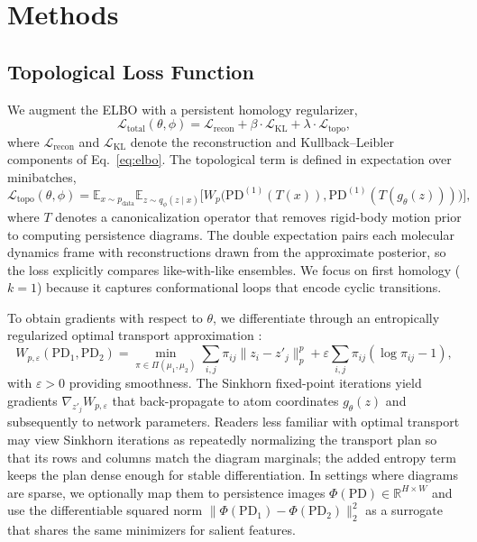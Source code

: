\documentclass[11pt]{article}
\theoremstyle{definition}
\begin{document}
\section{Methods}
\subsection{Topological Loss Function}
We augment the ELBO with a persistent homology regularizer,
\begin{equation}
    \mathcal{L}_{\text{total}}(\theta, \phi) = \mathcal{L}_{\text{recon}} + \beta \cdot \mathcal{L}_{\text{KL}} + \lambda \cdot \mathcal{L}_{\text{topo}},
    \label{eq:total_loss}
\end{equation}
where $\mathcal{L}_{\text{recon}}$ and $\mathcal{L}_{\text{KL}}$ denote the reconstruction and Kullback--Leibler components of Eq.~\eqref{eq:elbo}. The topological term is defined in expectation over minibatches,
\begin{equation}
    \mathcal{L}_{\text{topo}}(\theta, \phi) = \mathbb{E}_{x \sim p_{\text{data}}} \mathbb{E}_{z \sim q_\phi(z \mid x)} \big[ W_p\big( \mathrm{PD}^{(1)}(T(x)), \mathrm{PD}^{(1)}(T(g_\theta(z))) \big) \big],
    \label{eq:topo-loss}
\end{equation}
where $T$ denotes a canonicalization operator that removes rigid-body motion prior to computing persistence diagrams. The double expectation pairs each molecular dynamics frame with reconstructions drawn from the approximate posterior, so the loss explicitly compares like-with-like ensembles. We focus on first homology ($k=1$) because it captures conformational loops that encode cyclic transitions.

To obtain gradients with respect to $\theta$, we differentiate through an entropically regularized optimal transport approximation \cite{cuturi2013sinkhorn}:
\begin{equation}
    W_{p, \varepsilon}(\mathrm{PD}_1, \mathrm{PD}_2) = \min_{\pi \in \Pi(\mu_1, \mu_2)} \sum_{i,j} \pi_{ij} \| z_i - z'_j \|_p^p + \varepsilon \sum_{i,j} \pi_{ij} (\log \pi_{ij} - 1),
    \label{eq:entropic-wasserstein}
\end{equation}
with $\varepsilon > 0$ providing smoothness. The Sinkhorn fixed-point iterations yield gradients $\nabla_{z'_j} W_{p, \varepsilon}$ that back-propagate to atom coordinates $g_\theta(z)$ and subsequently to network parameters. Readers less familiar with optimal transport may view Sinkhorn iterations as repeatedly normalizing the transport plan so that its rows and columns match the diagram marginals; the added entropy term keeps the plan dense enough for stable differentiation. In settings where diagrams are sparse, we optionally map them to persistence images $\Phi(\mathrm{PD}) \in \mathbb{R}^{H \times W}$ and use the differentiable squared norm $\| \Phi(\mathrm{PD}_1) - \Phi(\mathrm{PD}_2) \|_2^2$ \cite{adams2017persistence} as a surrogate that shares the same minimizers for salient features.
\end{document}
